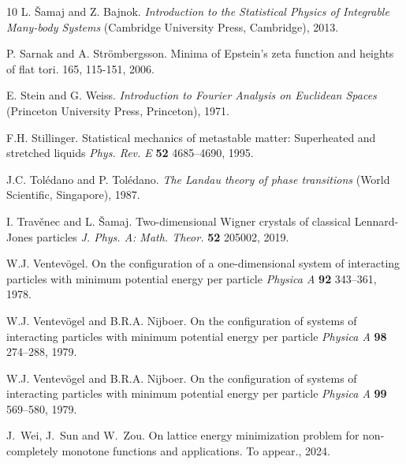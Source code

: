 \documentclass[12pt]{iopart}
\theoremstyle{definition}
\begin{document}
\begin{thebibliography}{10}
 L. \v{S}amaj and Z. Bajnok.
{\it Introduction to the Statistical Physics of Integrable Many-body Systems}   
(Cambridge University Press, Cambridge), 2013.

P. Sarnak and A. Str\"ombergsson.
\newblock Minima of Epstein’s zeta function and heights of flat tori.
 165, 115-151, 2006.

 E. Stein and G. Weiss.
{\it Introduction to Fourier Analysis on Euclidean Spaces}
(Princeton University Press, Princeton), 1971. 

  
 F.H. Stillinger.
Statistical mechanics of metastable matter: Superheated and stretched liquids 
{\it Phys. Rev. E} {\bf 52} 4685--4690, 1995.

 J.C. Tol\'edano and P. Tol\'edano.
{\it The Landau theory of phase transitions}
(World Scientific, Singapore), 1987.

 I. Trav\v enec and L. \v{S}amaj.
Two-dimensional Wigner crystals of classical Lennard-Jones particles  
{\it J. Phys. A: Math. Theor.} {\bf 52} 205002, 2019.

 W.J. Ventev\"ogel.
On the configuration of a one-dimensional system of interacting
particles with minimum potential energy per particle  
{\it Physica A} {\bf 92} 343--361, 1978.

 W.J. Ventev\"ogel and B.R.A. Nijboer.
On the configuration of systems of interacting particles with
minimum potential energy per particle  
{\it Physica A} {\bf 98} 274--288, 1979.

 W.J. Ventev\"ogel and B.R.A. Nijboer. 
On the configuration of systems of interacting particles with
minimum potential energy per particle  
{\it Physica A} {\bf 99} 569--580, 1979.

J.~Wei, J.~Sun and W.~Zou.
\newblock On lattice energy minimization problem for non-completely monotone
  functions and applications.
\newblock To appear., 2024.










\end{thebibliography}
\end{document}
